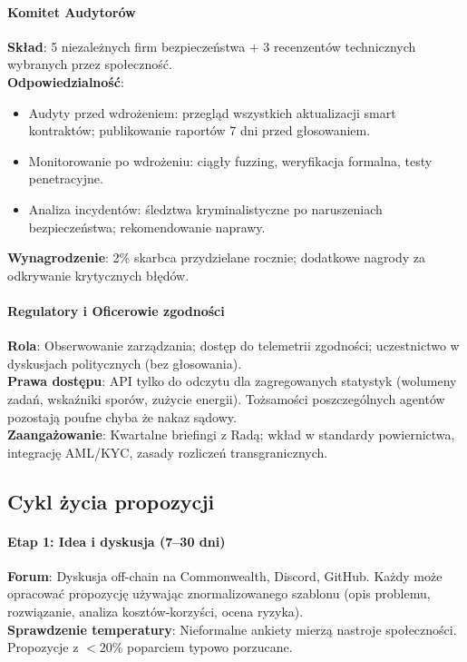 \documentclass[11pt]{article}
\begin{document}
\paragraph{Komitet Audytorów}
\textbf{Skład}: 5 niezależnych firm bezpieczeństwa + 3 recenzentów technicznych wybranych przez społeczność.\\
\textbf{Odpowiedzialność}:
\begin{itemize}[noitemsep]
  \item Audyty przed wdrożeniem: przegląd wszystkich aktualizacji smart kontraktów; publikowanie raportów 7 dni przed głosowaniem.
  \item Monitorowanie po wdrożeniu: ciągły fuzzing, weryfikacja formalna, testy penetracyjne.
  \item Analiza incydentów: śledztwa kryminalistyczne po naruszeniach bezpieczeństwa; rekomendowanie naprawy.
\end{itemize}
\textbf{Wynagrodzenie}: 2\% skarbca przydzielane rocznie; dodatkowe nagrody za odkrywanie krytycznych błędów.

\paragraph{Regulatory i Oficerowie zgodności}
\textbf{Rola}: Obserwowanie zarządzania; dostęp do telemetrii zgodności; uczestnictwo w dyskusjach politycznych (bez głosowania).\\
\textbf{Prawa dostępu}: API tylko do odczytu dla zagregowanych statystyk (wolumeny zadań, wskaźniki sporów, zużycie energii). Tożsamości poszczególnych agentów pozostają poufne chyba że nakaz sądowy.\\
\textbf{Zaangażowanie}: Kwartalne briefingi z Radą; wkład w standardy powiernictwa, integrację AML/KYC, zasady rozliczeń transgranicznych.

\subsection{Cykl życia propozycji}

\paragraph{Etap 1: Idea i dyskusja (7--30 dni)}
\textbf{Forum}: Dyskusja off-chain na Commonwealth, Discord, GitHub. Każdy może opracować propozycję używając znormalizowanego szablonu (opis problemu, rozwiązanie, analiza kosztów-korzyści, ocena ryzyka).\\
\textbf{Sprawdzenie temperatury}: Nieformalne ankiety mierzą nastroje społeczności. Propozycje z $<20\%$ poparciem typowo porzucane.
\end{document}
